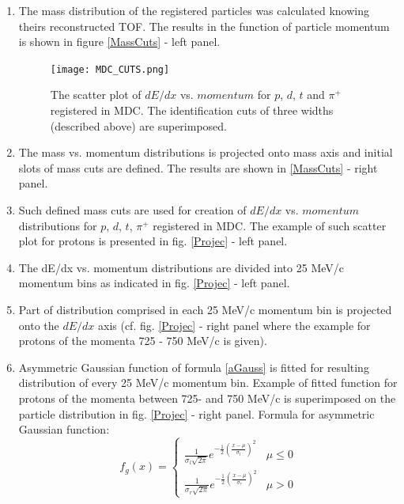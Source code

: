 \begin{enumerate}
	\item The mass distribution of the registered particles was calculated knowing theirs reconstructed TOF.  
	The results in the function of particle momentum is shown in figure \ref{MassCuts} - left panel. 
    \begin{figure}[!h]
   	\centering
   	\texttt{[image: MDC\_CUTS.png]}
   	\caption{The scatter plot of $dE/dx$ vs. $momentum$ for $p$, $d$, $t$ and $\pi^+$ registered in MDC. The identification cuts of three widths 
   	(described above) are superimposed. 
    }
   	\label{MDCcut}
   \end{figure}
	\item The mass vs. momentum distributions is projected onto mass axis and initial slots of mass cuts are defined. 
	The results are shown in \ref{MassCuts} - right panel. 
	\item Such defined mass cuts are used for creation of $dE/dx$ vs. $momentum$ distributions for $p$, $d$, $t$, $\pi^+$ registered in MDC. 
	The example of such scatter plot for protons is presented in fig. \ref{Projec} - left panel.
    \item The dE/dx vs. momentum distributions are divided into 25 MeV/c momentum bins as indicated in fig. \ref{Projec} - left panel.
    \item Part of distribution comprised in each 25 MeV/c momentum bin is projected onto the $dE/dx$ axis 
    (cf. fig. \ref{Projec} - right panel where the example for protons of the momenta 725 - 750 MeV/c is given).
    
   \item Asymmetric Gaussian function of formula \ref{aGauss} is fitted for resulting distribution of every 25 MeV/c momentum bin. Example of fitted function 
   for protons of the momenta between 725- and 750 MeV/c is superimposed on the particle distribution in fig. \ref{Projec} - right panel. 
   Formula for asymmetric Gaussian function:
    \begin{equation}
   	f_g(x)=\begin{cases}
   		\frac{1}{\sigma_l\sqrt{2\pi}}e^{-\frac{1}{2}\left(\frac{x-\mu}{\sigma_l}\right)^2}&\mu\le0\\
   		\frac{1}{\sigma_r\sqrt{2\pi}}e^{-\frac{1}{2}\left(\frac{x-\mu}{\sigma_r}\right)^2}&\mu>0
   	\end{cases}
   \label{aGauss}
   \end{equation}
   

\end{enumerate}
